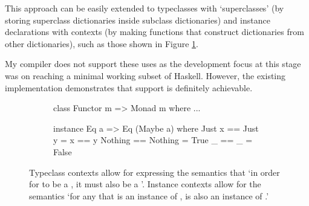 \documentclass[dissertation.tex]{subfiles}
\begin{document}
{{{            This approach can be easily extended to typeclasses with `superclasses' (by storing superclass dictionaries
            inside subclass dictionaries) and instance declarations with contexts (by making functions that construct
            dictionaries from other dictionaries), such as those shown in Figure \ref{fig:instance-context}.

            My compiler does not support these uses as the development focus at this stage was on reaching a minimal
            working subset of Haskell. However, the existing implementation demonstrates that support is definitely
            achievable.

            \begin{figure}[h]
            \centering
            \begin{subfigure}[t]{0.40\textwidth}
            \begin{haskellfigure}
            class Functor m => Monad m where
                ...
            \end{haskellfigure}
            \end{subfigure}
            \hspace{5mm}
            \begin{subfigure}[t]{0.40\textwidth}
            \begin{haskellfigure}
            instance Eq a => Eq (Maybe a) where
                Just x == Just y = x == y
                Nothing == Nothing = True
                _ == _ = False
            \end{haskellfigure}
            \end{subfigure}
            \caption{Typeclass contexts allow for expressing the semantics that `in order for  to be a , it must also be a '. Instance contexts allow for the semantics `for any  that is an instance of ,  is also an instance of .'}
            \label{fig:instance-context}
            \end{figure}
        }
    }
}
\end{document}
